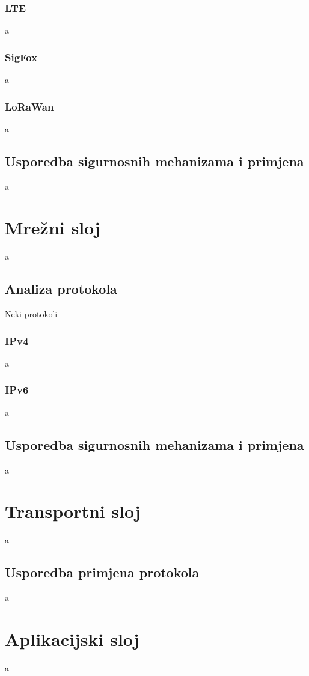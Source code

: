 \documentclass[times, utf8, diplomski]{fer}
\begin{document}
\subsubsection{LTE}
a

\subsubsection{SigFox}
a

\subsubsection{LoRaWan}
a

\subsection{Usporedba sigurnosnih mehanizama i primjena}
a

\section{Mrežni sloj}
a

\subsection{Analiza protokola}
Neki protokoli

\subsubsection{IPv4}
a

\subsubsection{IPv6}
a

\subsection{Usporedba sigurnosnih mehanizama i primjena}
a

\section{Transportni sloj}
a

\subsection{Usporedba primjena protokola}
a

\section{Aplikacijski sloj}
a
\end{document}
